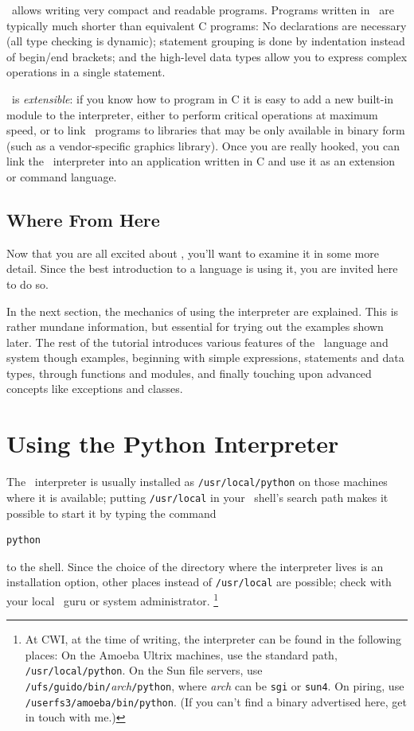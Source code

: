 \Python\ allows writing very compact and readable programs.
Programs written in \Python\ are typically much shorter than equivalent C
programs:
No declarations are necessary (all type checking is
dynamic); statement grouping is done by indentation instead of begin/end
brackets; and the high-level data types allow you to express complex
operations in a single statement.

\Python\ is
{\em extensible}:
if you know how to program in C it is easy to add a new built-in module
to the interpreter, either to perform critical operations at maximum
speed, or to link \Python\ programs to libraries that may be only available
in binary form (such as a vendor-specific graphics library).
Once you are really hooked, you can link the \Python\ interpreter into an
application written in C and use it as an extension or command language.

\subsection{Where From Here}

Now that you are all excited about \Python, you'll want to examine it in
some more detail.
Since the best introduction to a language is using it, you are invited
here to do so.

In the next section, the mechanics of using the interpreter are
explained.
This is rather mundane information, but essential for trying out the
examples shown later.
The rest of the tutorial introduces various features of the \Python\
language and system though examples, beginning with simple expressions,
statements and data types, through functions and modules, and finally
touching upon advanced concepts like exceptions and classes.

\section{Using the Python Interpreter}

The \Python\ interpreter is usually installed as
{\tt /usr/local/python}
on those machines where it is available; putting
{\tt /usr/local}
in your \UNIX\ shell's search path makes it possible to start it by
typing the command
\bcode\begin{verbatim}
python
\end{verbatim}\ecode
to the shell.
Since the choice of the directory where the interpreter lives is an
installation option, other places instead of
{\tt /usr/local}
are possible; check with your local \Python\ guru or system
administrator.%
\footnote{
	At CWI, at the time of writing, the interpreter can be found in
	the following places:
	On the Amoeba Ultrix machines, use the standard path,
	{\tt /usr/local/python}.
	On the Sun file servers, use
	{\tt /ufs/guido/bin/}{\em arch}{\tt /python},
	where {\em arch} can be {\tt sgi} or {\tt sun4}.
	On piring, use {\tt /userfs3/amoeba/bin/python}.
	(If you can't find a binary advertised here, get in touch with me.)
}

